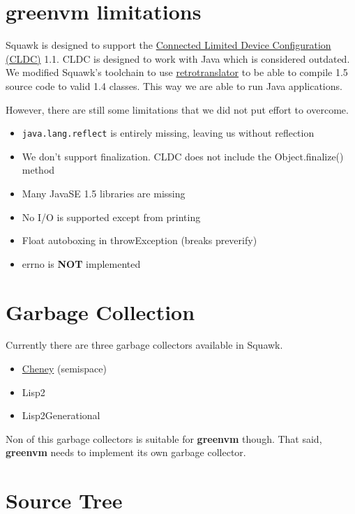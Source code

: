 \documentclass[
a4paper,
12pt,
]{report}
\newcommand{\gvm}{{\fontfamily{fco}\selectfont\textbf{\color{g}green\color{v}vm}}\xspace}
\newcommand{\java}{Java\texttrademark\xspace}
\begin{document}
\section{\gvm limitations}

Squawk is designed to support the
\href{https://en.wikipedia.org/wiki/CLDC}{Connected Limited Device
  Configuration (CLDC)} 1.1.  CLDC is designed to work with \java 1.4
which is considered outdated.  We modified Squawk's toolchain to use
\href{http://retrotranslator.sourceforge.net/}{retrotranslator} to be
able to compile 1.5 source code to valid 1.4 classes.  This way we are
able to run \java 1.5 applications.

However, there are still some limitations that we did not put effort
to overcome.

\begin{itemize}
\item \verb!java.lang.reflect! is entirely missing, leaving us without
  reflection
\item We don't support finalization. CLDC does not include the
  Object.finalize() method
\item Many JavaSE 1.5 libraries are missing
\item No I/O is supported except from printing
\item Float autoboxing in throwException (breaks preverify)
\item errno is \textbf{NOT} implemented

\end{itemize}

\section{Garbage Collection}

Currently there are three garbage collectors available in Squawk.

\begin{itemize}
\item \href{https://en.wikipedia.org/wiki/Cheney%27s_algorithm}{Cheney} (semispace)
\item Lisp2
\item Lisp2Generational
\end{itemize}

Non of this garbage collectors is suitable for \gvm though. That said,
\gvm needs to implement its own garbage collector. 

\section{Source Tree}
\label{sec:srctree}
\end{document}
